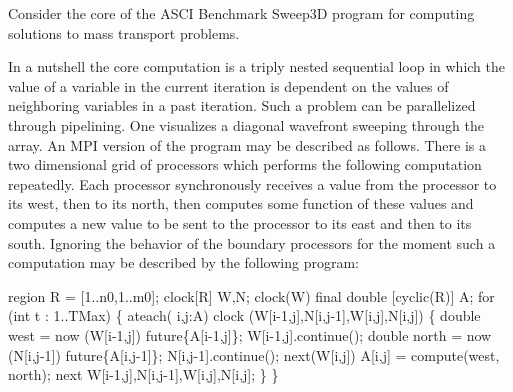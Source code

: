 Consider the core of the ASCI Benchmark Sweep3D program for computing
solutions to mass transport problems.

In a nutshell the core computation is a triply nested sequential loop
in which the value of a variable in the current iteration is dependent
on the values of neighboring variables in a past iteration. Such a
problem can be parallelized through pipelining. One visualizes a
diagonal wavefront sweeping through the array. An MPI version of the
program may be described as follows. There is a two dimensional grid
of processors which performs the following computation
repeatedly. Each processor synchronously receives a value from the
processor to its west, then to its north, then computes some function
of these values and computes a new value to be sent to the processor
to its east and then to its south.  Ignoring the behavior of the
boundary processors for the moment such a computation may be described
by the following \Xten{} program:

\begin{x10}
region R = [1..n0,1..m0];
clock[R] W,N;
clock(W) final double [cyclic(R)] A; 
for (int t : 1..TMax) \{
  ateach( i,j:A) 
    clock (W[i-1,j],N[i,j-1],W[i,j],N[i,j]) \{
      double west = now (W[i-1,j]) future\{A[i-1,j]\}; 
      W[i-1,j].continue();           
      double north = now (N[i,j-1]) future\{A[i,j-1]\}; 
      N[i,j-1].continue();
      next(W[i,j]) A[i,j] = compute(west, north);
      next W[i-1,j],N[i,j-1],W[i,j],N[i,j];
  \}
\}
\end{x10}

